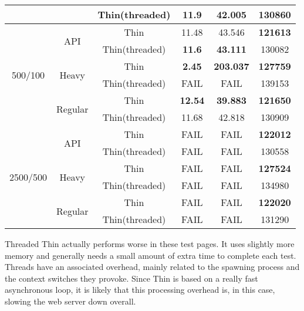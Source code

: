 \begin{table}[h!t]
\begin{tabular}{c|c|c|c|c|c}
     &  & Thin(threaded) & 11.9 & 42.005 & 130860\\\hline
    \multirow{6}{*}{500/100} & \multirow{2}{*}{API} & Thin & 11.48 & 43.546 & \textbf{121613}\\\cline{3-6}
     &  & Thin(threaded) & \textbf{11.6} & \textbf{43.111} & 130082\\\cline{2-6}
     & \multirow{2}{*}{Heavy} & Thin & \textbf{2.45} & \textbf{203.037} & \textbf{127759}\\\cline{3-6}
     &  & Thin(threaded) & FAIL & FAIL & 139153\\\cline{2-6}
     & \multirow{2}{*}{Regular} & Thin & \textbf{12.54} & \textbf{39.883} & \textbf{121650}\\\cline{3-6}
     &  & Thin(threaded) & 11.68 & 42.818 & 130909\\\hline
    \multirow{6}{*}{2500/500} & \multirow{2}{*}{API} & Thin & FAIL & FAIL & \textbf{122012}\\\cline{3-6}
     &  & Thin(threaded) & FAIL & FAIL & 130558\\\cline{2-6}
     & \multirow{2}{*}{Heavy} & Thin & FAIL & FAIL & \textbf{127524}\\\cline{3-6}
     &  & Thin(threaded) & FAIL & FAIL & 134980\\\cline{2-6}
     & \multirow{2}{*}{Regular} & Thin & FAIL & FAIL & \textbf{122020}\\\cline{3-6}
     &  & Thin(threaded) & FAIL & FAIL & 131290\\
  \end{tabular}
\end{table}

Threaded Thin actually performs worse in these test pages. It uses slightly more memory and generally needs a small amount of extra time to complete each test. Threads have an associated overhead, mainly related to the spawning process and the context switches they provoke. Since Thin is based on a really fast asynchronous loop, it is likely that this processing overhead is, in this case, slowing the web server down overall.
